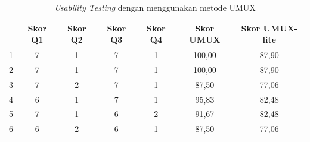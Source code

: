 \begin{table}[H]
	\centering
	\caption{\textit{Usability Testing} dengan menggunakan metode UMUX}
	\label{UMUX}
	\begin{tabular}{|ccccc|c|c|}
		\hline
		\rowcolor[HTML]{CBCEFB}
		\multicolumn{1}{|c|}{\cellcolor[HTML]{CBCEFB}Responden} & \multicolumn{1}{c|}{\cellcolor[HTML]{CBCEFB}Skor Q1} & \multicolumn{1}{c|}{\cellcolor[HTML]{CBCEFB}Skor Q2} & \multicolumn{1}{c|}{\cellcolor[HTML]{CBCEFB}Skor Q3} & Skor Q4 & Skor UMUX & Skor UMUX-lite \\ \hline
		\multicolumn{1}{|c|}{1}                                 & \multicolumn{1}{c|}{7}                               & \multicolumn{1}{c|}{1}                               & \multicolumn{1}{c|}{7}                               & 1       & 100,00    & 87,90          \\ \hline
		\multicolumn{1}{|c|}{2}                                 & \multicolumn{1}{c|}{7}                               & \multicolumn{1}{c|}{1}                               & \multicolumn{1}{c|}{7}                               & 1       & 100,00    & 87,90          \\ \hline
		\multicolumn{1}{|c|}{3}                                 & \multicolumn{1}{c|}{7}                               & \multicolumn{1}{c|}{2}                               & \multicolumn{1}{c|}{7}                               & 1       & 87,50     & 77,06          \\ \hline
		\multicolumn{1}{|c|}{4}                                 & \multicolumn{1}{c|}{6}                               & \multicolumn{1}{c|}{1}                               & \multicolumn{1}{c|}{7}                               & 1       & 95,83     & 82,48          \\ \hline
		\multicolumn{1}{|c|}{5}                                 & \multicolumn{1}{c|}{7}                               & \multicolumn{1}{c|}{1}                               & \multicolumn{1}{c|}{6}                               & 2       & 91,67     & 82,48          \\ \hline
		\multicolumn{1}{|c|}{6}                                 & \multicolumn{1}{c|}{6}                               & \multicolumn{1}{c|}{2}                               & \multicolumn{1}{c|}{6}                               & 1       & 87,50     & 77,06          \\ \hline

\end{tabular}
\end{table}

